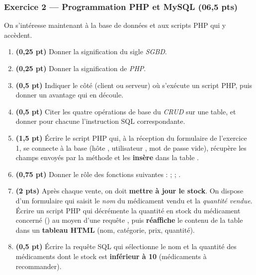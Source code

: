 \subsubsection*{Exercice 2 — Programmation PHP et MySQL \hfill (06,5 pts)}

\noindent On s'intéresse maintenant à la base de données  et aux scripts
PHP qui y accèdent.

\begin{enumerate}[label=\textbf{\arabic*.}]
\item \textbf{(0,25 pt)} Donner la signification du sigle \emph{SGBD}.
\item \textbf{(0,25 pt)} Donner la signification de \emph{PHP}.
\item \textbf{(0,5 pt)} Indiquer le côté (client ou serveur) où s'exécute un script PHP,
puis donner un avantage qui en découle.
\item \textbf{(0,5 pt)} Citer les quatre opérations de base du \emph{CRUD} sur une table,
et donner pour chacune l'instruction SQL correspondante.
\item \textbf{(1,5 pt)} Écrire le script PHP  qui, à la réception du
formulaire de l'exercice 1, se connecte à la base  (hôte
, utilisateur , mot de passe vide), récupère les champs envoyés
par la méthode  et les \textbf{insère} dans la table .
\item \textbf{(0,75 pt)} Donner le rôle des fonctions suivantes :
 ;  ; .
\item \textbf{(2 pts)} Après chaque vente, on doit \textbf{mettre à jour le stock}. On
dispose d'un formulaire qui saisit le \emph{nom} du médicament vendu et la
\emph{quantité vendue}. Écrire un script PHP  qui décrémente la quantité
en stock du médicament concerné () au moyen
d'une requête , puis \textbf{réaffiche} le contenu de la table
 dans un \textbf{tableau HTML} (nom, catégorie, prix, quantité).
\item \textbf{(0,5 pt)} Écrire la requête SQL qui sélectionne le nom et la quantité des
médicaments dont le stock est \textbf{inférieur à 10} (médicaments à recommander).
\end{enumerate}


